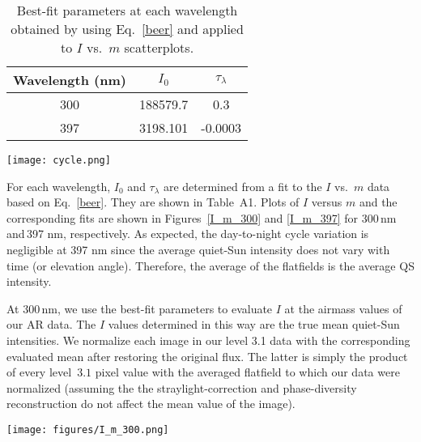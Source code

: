 \documentclass[goettingen, gauss, print]{thesis}
\begin{document}
\begin{table}[ht!]
\caption{Best-fit parameters at each wavelength obtained by using Eq.~\ref{beer} and applied to $I$ vs.~$m$ scatterplots. }
\label{fit_params}
\centering
\begin{tabular}{c c c}
\hline \hline

Wavelength (nm) &$I_0$ & $\tau_{\lambda}$  \\
\hline
300 &  188579.7 & 0.3 \\
\hline
397 & 3198.101 &  -0.0003 \\
\hline
\hline
\end{tabular}

\end{table}


\begin{figure*}[ht!]
\begin{center}
\hspace*{-3cm}\texttt{[image: cycle.png]}
\caption{Part of the day-to-night cycle of the photon flux at 300\,nm and 397\,nm for quiet-Sun images taken at disk center.
}
\end{center}
\label{cycle}
\end{figure*}


For each wavelength, $I_0$ and $\tau_{\lambda}$ are determined from a fit to the $I$ vs.~$m$ data based on Eq.~\ref{beer}. They are shown in Table~A1. Plots of $I$ versus $m$ and the corresponding fits are shown in Figures~\ref{I_m_300} and \ref{I_m_397} for 300\,nm and\,397 nm, respectively.
As expected, the day-to-night cycle variation is negligible at 397 nm since the average quiet-Sun intensity does not vary with time (or elevation angle). Therefore, the average of the flatfields is the average QS intensity. %

At 300\,nm, we use the best-fit parameters to evaluate $I$ at the airmass values of our AR data. The $I$ values determined in this way are the true mean quiet-Sun intensities. We normalize each image in our level 3.1 data with the corresponding evaluated mean after restoring the original flux. The latter is simply the product of every level~$3.1$ pixel value with the averaged flatfield to which our data were normalized (assuming the the straylight-correction and phase-diversity reconstruction do not affect the mean value of the image).\\

\begin{figure*}[ht!]
\centering
\hspace*{-2cm}\texttt{[image: figures/I\_m\_300.png]}
\caption{Red data points: the 300\,nm quiet-Sun photon flux vs. $m$, the air mass factor during the 4 hours observing period. The best-fit blue curve was calculated according to Equation~\ref{beer} with the parameters given in Table~A1.}
\label{I_m_300}
\end{figure*}
\end{document}
